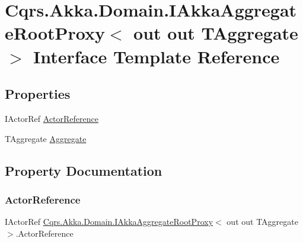 \hypertarget{interfaceCqrs_1_1Akka_1_1Domain_1_1IAkkaAggregateRootProxy}{}\section{Cqrs.\+Akka.\+Domain.\+I\+Akka\+Aggregate\+Root\+Proxy$<$ out out T\+Aggregate $>$ Interface Template Reference}
\label{interfaceCqrs_1_1Akka_1_1Domain_1_1IAkkaAggregateRootProxy}
\subsection*{Properties}
\begin{DoxyCompactItemize}
\item 
I\+Actor\+Ref \hyperlink{interfaceCqrs_1_1Akka_1_1Domain_1_1IAkkaAggregateRootProxy_a60561a15fa10bec1218bc37d30d8f9a5}{Actor\+Reference}
\item 
T\+Aggregate \hyperlink{interfaceCqrs_1_1Akka_1_1Domain_1_1IAkkaAggregateRootProxy_a97a7315b1dd655f9e71e24dfbde514a8}{Aggregate}
\end{DoxyCompactItemize}


\subsection{Property Documentation}
\mbox{\label{interfaceCqrs_1_1Akka_1_1Domain_1_1IAkkaAggregateRootProxy_a60561a15fa10bec1218bc37d30d8f9a5}} 
\subsubsection{\texorpdfstring{Actor\+Reference}{ActorReference}}
{\footnotesize\ttfamily I\+Actor\+Ref \hyperlink{interfaceCqrs_1_1Akka_1_1Domain_1_1IAkkaAggregateRootProxy}{Cqrs.\+Akka.\+Domain.\+I\+Akka\+Aggregate\+Root\+Proxy}$<$ out out T\+Aggregate $>$.Actor\+Reference\hspace{0.3cm}{\ttfamily [get]}}

